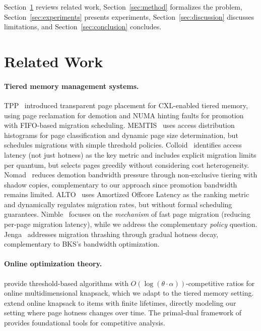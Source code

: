 \documentclass{article}
\begin{document}
Section~\ref{sec:related} reviews related work, Section~\ref{sec:method} formalizes the problem, Section~\ref{sec:experiments} presents experiments, Section~\ref{sec:discussion} discusses limitations, and Section~\ref{sec:conclusion} concludes.

\section{Related Work}
\label{sec:related}

\paragraph{Tiered memory management systems.}
TPP~\citep{tpp2023} introduced transparent page placement for CXL-enabled tiered memory, using page reclamation for demotion and NUMA hinting faults for promotion with FIFO-based migration scheduling. MEMTIS~\citep{memtis2023} uses access distribution histograms for page classification and dynamic page size determination, but schedules migrations with simple threshold policies. Colloid~\citep{colloid2024} identifies access latency (not just hotness) as the key metric and includes explicit migration limits per quantum, but selects pages greedily without considering cost heterogeneity. Nomad~\citep{nomad2024} reduces demotion bandwidth pressure through non-exclusive tiering with shadow copies, complementary to our approach since promotion bandwidth remains limited. ALTO~\citep{alto2025} uses Amortized Offcore Latency as the ranking metric and dynamically regulates migration rates, but without formal scheduling guarantees. Nimble~\citep{nimble2019} focuses on the \emph{mechanism} of fast page migration (reducing per-page migration latency), while we address the complementary \emph{policy} question. Jenga~\citep{jenga2025} addresses migration thrashing through gradual hotness decay, complementary to BKS's bandwidth optimization.

\paragraph{Online optimization theory.}
\citet{lechowicz2022} provide threshold-based algorithms with $O(\log(\theta \cdot \alpha))$-competitive ratios for online multidimensional knapsack, which we adapt to the tiered memory setting. \citet{sun2023} extend online knapsack to items with finite lifetimes, directly modeling our setting where page hotness changes over time. The primal-dual framework of \citet{buchbinder2009} provides foundational tools for competitive analysis.
\end{document}
